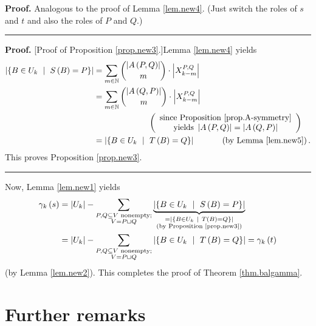 \documentclass[numbers=enddot,12pt,final,onecolumn,notitlepage]{scrartcl}%
\theoremstyle{definition}
\newenvironment{proof}[1][Proof]{\noindent\textbf{#1.} }{\ \rule{0.5em}{0.5em}}
\let\sumnonlimits\sum
\renewcommand{\sum}{\sumnonlimits\limits}
\theoremstyle{plainsl}
\begin{document}
\begin{proof}
Analogous to the proof of Lemma \ref{lem.new4}. (Just switch the roles of $s$
and $t$ and also the roles of $P$ and $Q$.)
\end{proof}

\begin{proof}
[Proof of Proposition \ref{prop.new3}.]Lemma \ref{lem.new4} yields%
\begin{align*}
\left\vert \left\{  B\in U_{k}\ \mid\ S\left(  B\right)  =P\right\}
\right\vert  &  =\sum_{m\in\mathbb{N}}\dbinom{\left\vert A\left(  P,Q\right)
\right\vert }{m}\cdot\left\vert X_{k-m}^{P,Q}\right\vert \\
&  =\sum_{m\in\mathbb{N}}\dbinom{\left\vert A\left(  Q,P\right)  \right\vert
}{m}\cdot\left\vert X_{k-m}^{P,Q}\right\vert \\
&  \ \ \ \ \ \ \ \ \ \ \ \ \ \ \ \ \ \ \ \ \left(
\begin{array}
[c]{c}%
\text{since Proposition \ref{prop.A-symmetry}}\\
\text{yields }\left\vert A\left(  P,Q\right)  \right\vert =\left\vert A\left(
Q,P\right)  \right\vert
\end{array}
\right)  \\
&  =\left\vert \left\{  B\in U_{k}\ \mid\ T\left(  B\right)  =Q\right\}
\right\vert \ \ \ \ \ \ \ \ \ \ \left(  \text{by Lemma \ref{lem.new5}}\right)
.
\end{align*}
This proves Proposition \ref{prop.new3}.
\end{proof}

Now, Lemma \ref{lem.new1} yields%
\begin{align*}
\gamma_{k}\left(  s\right)    & =\left\vert U_{k}\right\vert -\sum
_{\substack{P,Q\subseteq V\text{ nonempty;}\\V=P\sqcup Q}%
}\underbrace{\left\vert \left\{  B\in U_{k}\ \mid\ S\left(  B\right)
=P\right\}  \right\vert }_{\substack{=\left\vert \left\{  B\in U_{k}%
\ \mid\ T\left(  B\right)  =Q\right\}  \right\vert \\\text{(by Proposition
\ref{prop.new3})}}}\\
& =\left\vert U_{k}\right\vert -\sum_{\substack{P,Q\subseteq V\text{
nonempty;}\\V=P\sqcup Q}}\left\vert \left\{  B\in U_{k}\ \mid\ T\left(
B\right)  =Q\right\}  \right\vert =\gamma_{k}\left(  t\right)
\end{align*}
(by Lemma \ref{lem.new2}). This completes the proof of Theorem
\ref{thm.balgamma}.

\section{Further remarks}
\end{document}
